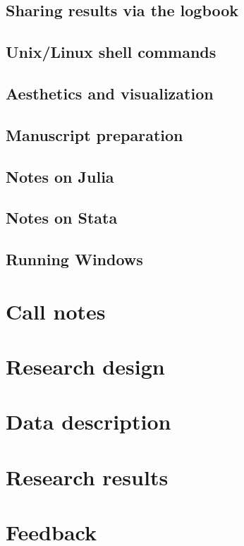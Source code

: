 \documentclass{report}
\numberwithin{equation}{section}
\numberwithin{figure}{section}
\numberwithin{table}{section}
\begin{document}
\section{Sharing results via the logbook} 

\section{Unix/Linux shell commands} 
\section{Aesthetics and visualization} 
\section{Manuscript preparation} 
\section{Notes on Julia} 
\section{Notes on Stata} 
\section{Running Windows} 

\chapter{Call notes}

\chapter{Research design}

\chapter{Data description}

\chapter{Research results}

\chapter{Feedback}


\end{document}
